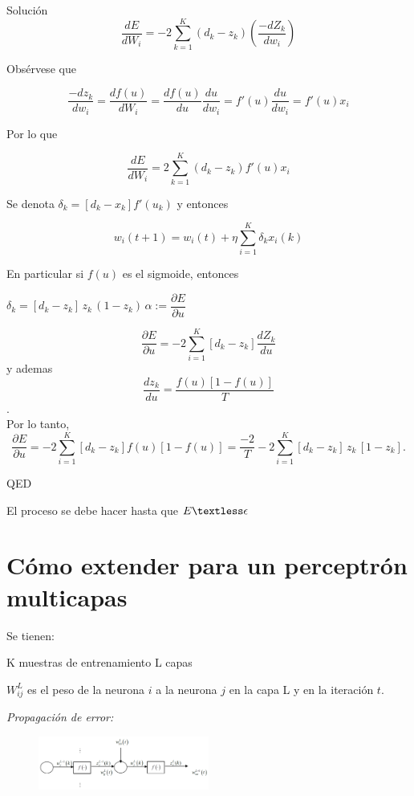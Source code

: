Solución
\\

$$
\dfrac{dE}{dW_i} = -2  \sum_{k=1}^{K}
(d_k - z_k) (\dfrac{-dZ_k}{dw_i})
$$

Obsérvese que

$$\dfrac{-dz_k}{dw_i} = \dfrac{df(u)}{dW_i} = \dfrac{df(u)}{du} \dfrac{du}{dw_i} = f'(u) \dfrac{du}{dw_i} = f'(u) x_i
$$

Por lo que

$$
\dfrac{dE}{dW_i} = 2 \sum_{k=1}^{K} (d_k - z_k) f'(u) x_i
$$

Se denota $\delta_k = [d_k - x_k] f'(u_k)$ y entonces

\begin{scaja}
	$$ w_i(t + 1) = w_i(t) + \eta \sum_{i=1}^{K} \delta_k x_i (k) $$
\end{scaja}

En particular si $f(u)$ es el sigmoide, entonces

$\delta_k=[d_k - z_k] \, z_k \,  (1-z_k)\, \alpha := \dfrac{\partial E}{\partial u}
$

\begin{scaja}
	$$ \dfrac{\partial E}{\partial u} = -2 \sum_{i=1}^{K} [d_k - z_k] \dfrac{dZ_k}{du} $$ y ademas $$\dfrac{dz_k}{du}= \dfrac{f(u)[1 - f(u)]}{T}
	$$.   \\  Por lo tanto, 
	$$
	\dfrac{\partial E}{\partial u} = -2 \sum_{i=1}^{K} [d_k - z_k] f(u) [1 - f(u)] = \dfrac{-2}{T} -2 \sum_{i=1}^{K} [d_k - z_k] \, z_k \, [1-z_k]. 
	$$
\begin{center}
	QED
\end{center}	
\end{scaja}

El proceso se debe hacer hasta que $E\textless \epsilon$


\section{Cómo extender para un perceptrón multicapas}

Se tienen:

K muestras de entrenamiento
L capas

$W_{ij}^L$ es el peso de la neurona $i$ a la neurona $j$ en la capa L y en la iteración $t$.

\textit{Propagación de error:}

\begin{figure}[h!]
	\centering
	\includegraphics[width=0.5\textwidth]{images/img78.png}
	\label{figura78}
\end{figure}

